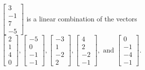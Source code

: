 \begin{exercise}
\begin{exerciseStatement}
  \end{exerciseStatement}
  \begin{exerciseAnswer}
   \(\left[\begin{array}{c}
3 \\
-1 \\
7 \\
-5
\end{array}\right]\) 
  	 is  
	a linear combination of the vectors \(\left[\begin{array}{c}
2 \\
1 \\
4 \\
0
\end{array}\right] , \left[\begin{array}{c}
-5 \\
0 \\
-1 \\
-1
\end{array}\right] , \left[\begin{array}{c}
-3 \\
1 \\
-2 \\
2
\end{array}\right] , \left[\begin{array}{c}
4 \\
2 \\
-2 \\
-1
\end{array}\right] , \text{ and } \left[\begin{array}{c}
0 \\
-1 \\
-4 \\
-1
\end{array}\right]\).

	
  


  \end{exerciseAnswer}
\end{exercise}